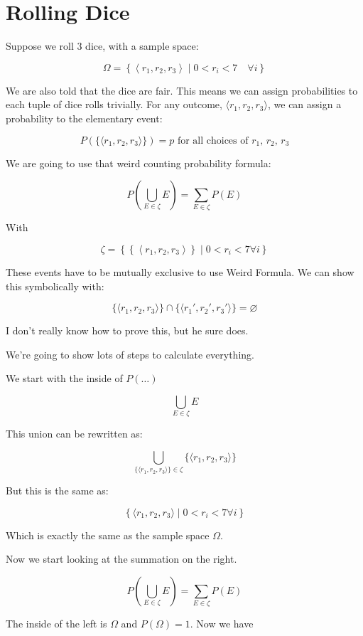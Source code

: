 \documentclass{article}
\begin{document}
\section*{Rolling Dice}

Suppose we roll 3 dice, with a sample space:

\[
\Omega=\left\{\left\langle r_1, r_2, r_3\right\rangle\mid 0<r_i<7\quad\forall i\right\}
\]

We are also told that the dice are fair. This means we can assign
probabilities to each tuple of dice rolls trivially. For any outcome,
$\langle{}r_1,r_2,r_3\rangle$, we can assign a probability to the
elementary event:

\[
P(\{\langle r_1,r_2,r_3\rangle\})=p\text{ for all choices of $r_1$, $r_2$, $r_3$}
\]

We are going to use that weird counting probability formula:

\[
P\left(\bigcup\limits_{E\in\zeta}E\right)=\sum\limits_{E\in\zeta}P(E)
\]

With

\[
\zeta=\left\{\left\{\left\langle r_1,r_2,r_3\right\rangle\right\}\mid 0<r_i<7\forall i\right\}
\]

These events have to be mutually exclusive to use Weird Formula. We
can show this symbolically with:

\[
\{\langle r_1,r_2,r_3\rangle\}\cap\{\langle r_1', r_2', r_3'\rangle\} = \varnothing
\]

I don't really know how to prove this, but he sure does.

We're going to show lots of steps to calculate everything.

We start with the inside of $P(\dots)$

\[
\bigcup\limits_{E\in\zeta}E
\]

This union can be rewritten as:

\[
\bigcup\limits_{\{\langle r_1,r_2,r_3\rangle\}\in\zeta} \{\langle r_1,r_2,r_3\rangle\}
\]

But this is the same as:

\[
\left\{\langle r_1,r_2,r_3\rangle\mid 0<r_i<7\forall i\right\}
\]

Which is exactly the same as the sample space $\Omega$.

Now we start looking at the summation on the right.

\[
P\left(\bigcup\limits_{E\in\zeta}E\right) = \sum\limits_{E\in\zeta} P(E)
\]

The inside of the left is $\Omega$ and $P(\Omega)=1$. Now we have
\end{document}
